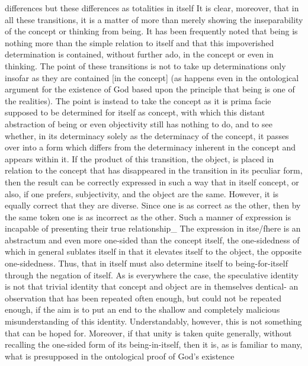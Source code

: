     differences but these differences as totalities in itself
    It is clear, moreover, that in all these transitions, it is a matter
    of more than merely showing the inseparability of the concept or
    thinking from being. It has been frequently noted that being is
    nothing more than the simple relation to itself and that this
    impoverished determination is contained, without further ado, in
    the concept or even in thinking. The point of these transitions is not
    to take up determinations only insofar as they are contained [in the
    concept] (as happens even in the ontological argument for the
    existence of God based upon the principle that being is one of the
    realities). The point is instead to take the concept as it is prima facie
    supposed to be determined for itself as concept, with which this
    distant abstraction of being or even objectivity still has nothing to
    do, and to see whether, in its determinacy solely as the determinacy
    of the concept, it passes over into a form which differs from the
    determinacy inherent in the concept and appears within it.
    If the product of this transition, the object, is placed in relation to
    the concept that has disappeared in the transition in its peculiar
    form, then the result can be correctly expressed in such a way that in
    itself concept, or also, if one prefers, subjectivity, and the object are
    the same. However, it is equally correct that they are diverse. Since one
    is as correct as the other, then by the same token one is as incorrect
    as the other. Such a manner of expression is incapable of presenting
    their true relationship_ The expression in itse/fhere is an abstractum
    and even more one-sided than the concept itself, the one-sidedness
    of which in general sublates itself in that it elevates
    itself to the object, the opposite one-sidedness.
    Thus, that in itself must also determine itself to being-for-itself through the
    negation of itself.
    As is everywhere the case, the speculative identity is
    not that trivial identity that concept and object are in themselves
    dentical- an observation that has been repeated often enough, but
    could not be repeated enough, if the aim is to put an end to the
    shallow and completely malicious misunderstanding of this identity.
    Understandably, however, this is not something that can be hoped for.
    Moreover, if that unity is taken quite generally, without recalling
    the one-sided form of its being-in-itself, then it is, as is familiar to
    many, what is presupposed in the ontological proof of God's existence
